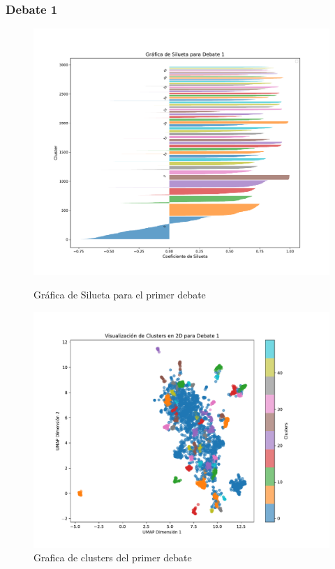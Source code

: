 \documentclass[10pt, a4paper]{article}
\begin{document}
	\subsubsection{Debate 1}
	\begin{figure}[h!]
		\centering
		\begin{minipage}{0.49\textwidth} %
			\includegraphics[width=\linewidth]{silhouette_debate1.pdf} 
			\caption{Gráfica de Silueta para el primer debate}
			\label{fig:silDeb1}
		\end{minipage}
		\hfill %
		\begin{minipage}{0.49\textwidth}
			\includegraphics[width=\linewidth]{clusters_debate1.pdf}
			\caption{Grafica de clusters del primer debate}
			\label{fig:clustDeb1}
		\end{minipage}
	\end{figure}
	
\end{document}
